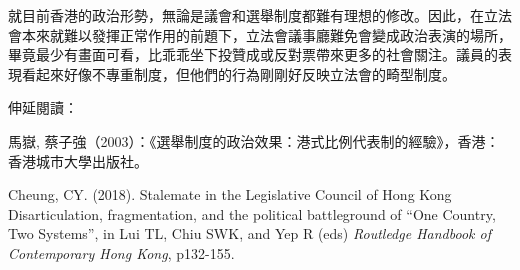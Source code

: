就目前香港的政治形勢，無論是議會和選舉制度都難有理想的修改。因此，在立法會本來就難以發揮正常作用的前題下，立法會議事廳難免會變成政治表演的場所，畢竟最少有畫面可看，比乖乖坐下投贊成或反對票帶來更多的社會關注。議員的表現看起來好像不專重制度，但他們的行為剛剛好反映立法會的畸型制度。



伸延閱讀：

馬嶽, 蔡子強（2003）：《選舉制度的政治效果：港式比例代表制的經驗》，香港：香港城市大學出版社。

Cheung, CY. (2018). Stalemate in the Legislative Council of Hong Kong Disarticulation, fragmentation, and the political battleground of “One Country, Two Systems”, in Lui TL, Chiu SWK, and Yep R (eds) \textit{Routledge Handbook of Contemporary Hong Kong}, p132-155.